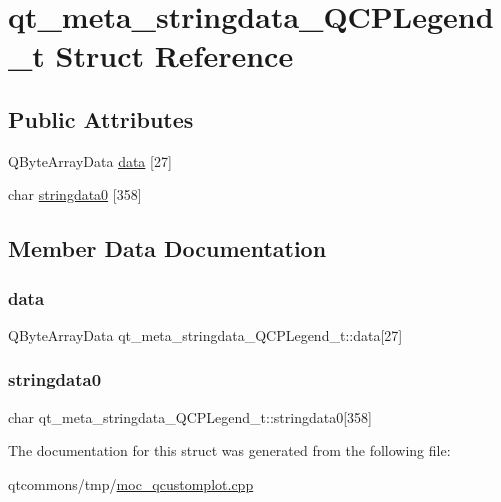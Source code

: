 \hypertarget{structqt__meta__stringdata___q_c_p_legend__t}{}\section{qt\+\_\+meta\+\_\+stringdata\+\_\+\+Q\+C\+P\+Legend\+\_\+t Struct Reference}
\label{structqt__meta__stringdata___q_c_p_legend__t}
\subsection*{Public Attributes}
\begin{DoxyCompactItemize}
\item 
Q\+Byte\+Array\+Data \mbox{\hyperlink{structqt__meta__stringdata___q_c_p_legend__t_ad8e758839b2e9818ac5f23a303aa99e7}{data}} \mbox{[}27\mbox{]}
\item 
char \mbox{\hyperlink{structqt__meta__stringdata___q_c_p_legend__t_ad3fb75c2831542ab8fdf3b1e50696a64}{stringdata0}} \mbox{[}358\mbox{]}
\end{DoxyCompactItemize}


\subsection{Member Data Documentation}
\mbox{\label{structqt__meta__stringdata___q_c_p_legend__t_ad8e758839b2e9818ac5f23a303aa99e7}} 
\subsubsection{\texorpdfstring{data}{data}}
{\footnotesize\ttfamily Q\+Byte\+Array\+Data qt\+\_\+meta\+\_\+stringdata\+\_\+\+Q\+C\+P\+Legend\+\_\+t\+::data\mbox{[}27\mbox{]}}

\mbox{\label{structqt__meta__stringdata___q_c_p_legend__t_ad3fb75c2831542ab8fdf3b1e50696a64}} 
\subsubsection{\texorpdfstring{stringdata0}{stringdata0}}
{\footnotesize\ttfamily char qt\+\_\+meta\+\_\+stringdata\+\_\+\+Q\+C\+P\+Legend\+\_\+t\+::stringdata0\mbox{[}358\mbox{]}}



The documentation for this struct was generated from the following file\+:\begin{DoxyCompactItemize}
\item 
qtcommons/tmp/\mbox{\hyperlink{moc__qcustomplot_8cpp}{moc\+\_\+qcustomplot.\+cpp}}\end{DoxyCompactItemize}
